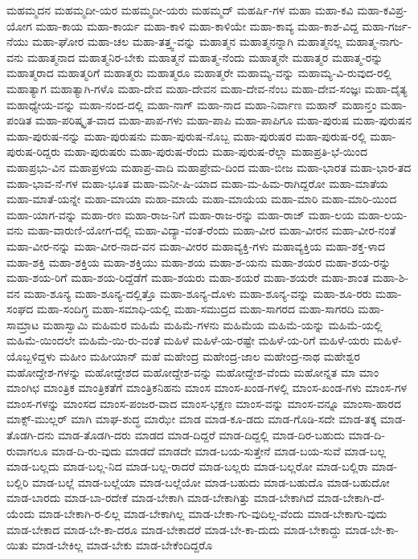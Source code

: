 {ಮಹಮ್ಮದನ
ಮಹಮ್ಮದೀ-ಯರ
ಮಹಮ್ಮದೀ-ಯರು
ಮಹಮ್ಮದ್
ಮಹರ್ಷಿ-ಗಳ
ಮಹಾ
ಮಹಾ-ಕವಿ
ಮಹಾ-ಕವಿಪ್ರ-ಯೋಗ
ಮಹಾ-ಕಾಯ
ಮಹಾ-ಕಾರ್ಯ
ಮಹಾ-ಕಾಳಿ
ಮಹಾ-ಕಾಳಿಯೇ
ಮಹಾ-ಕಾವ್ಯ
ಮಹಾ-ಕಾಶ-ವಿದ್ದ
ಮಹಾ-ಗರ್ಜ-ನೆಯು
ಮಹಾ-ಘೋರ
ಮಹಾ-ಚಲ
ಮಹಾ-ತತ್ತ್ವ-ವನ್ನು
ಮಹಾತ್ಮನ
ಮಹಾತ್ಮನನ್ನಾಗಿ
ಮಹಾತ್ಮನಲ್ಲ
ಮಹಾತ್ಮ-ನಾಗು-ವನು
ಮಹಾತ್ಮನಾದ
ಮಹಾತ್ಮನಿರ-ಬೇಕು
ಮಹಾತ್ಮನೆ
ಮಹಾತ್ಮ-ನೆಂದು
ಮಹಾತ್ಮನೇ
ಮಹಾತ್ಮರ
ಮಹಾತ್ಮ-ರನ್ನು
ಮಹಾತ್ಮರಾದ
ಮಹಾತ್ಮರಿಗೆ
ಮಹಾತ್ಮರು
ಮಹಾತ್ಮರೂ
ಮಹಾತ್ಮರೇ
ಮಹಾಮ್ಯ-ವನ್ನು
ಮಹಾಮ್ಯ-ವಿ-ರುವುದ-ರಲ್ಲಿ
ಮಹಾತ್ಯಾಗ
ಮಹಾತ್ಯಾಗಿ-ಗಳೊ
ಮಹಾ-ದೇವ
ಮಹಾ-ದೇವನ
ಮಹಾ-ದೇವ-ನೆಂಬ
ಮಹಾ-ದೇವ-ಸಂಜ್ಞಃ
ಮಹಾ-ದೈತ್ಯ
ಮಹಾಧ್ಯೇಯ-ವನ್ನು
ಮಹಾ-ನಂದ-ದಲ್ಲಿ
ಮಹಾ-ನಾಗ್
ಮಹಾ-ನಾದ
ಮಹಾ-ನಿರ್ವಾಣ
ಮಹಾನ್
ಮಹಾನ್ತಂ
ಮಹಾ-ಪಂಡಿತ
ಮಹಾ-ಪರಿಷ್ಕೃತ-ವಾದ
ಮಹಾ-ಪಾಪ-ಗಳು
ಮಹಾ-ಪಾಪಿ
ಮಹಾ-ಪಾಪಿಗೂ
ಮಹಾ-ಪುರುಷ
ಮಹಾ-ಪುರುಷನ
ಮಹಾ-ಪುರುಷ-ನನ್ನು
ಮಹಾ-ಪುರುಷನು
ಮಹಾ-ಪುರುಷ-ನೊಬ್ಬ
ಮಹಾ-ಪುರುಷರ
ಮಹಾ-ಪುರುಷ-ರಲ್ಲಿ
ಮಹಾ-ಪುರುಷ-ರಿದ್ದರು
ಮಹಾ-ಪುರುಷರು
ಮಹಾ-ಪುರುಷ-ರೆಂದು
ಮಹಾ-ಪುರುಷ-ರೆಲ್ಲಾ
ಮಹಾಪ್ರತಿ-ಭೆ-ಯಿಂದ
ಮಹಾಪ್ರಭು-ವಿನ
ಮಹಾಪ್ರಳಯ
ಮಹಾಪ್ರ-ವಾದಿ
ಮಹಾಪ್ರೇಮ-ದಿಂದ
ಮಹಾ-ಬೀಜ
ಮಹಾ-ಭಾರತ
ಮಹಾ-ಭಾರ-ತದ
ಮಹಾ-ಭಾವ-ನೆ-ಗಳ
ಮಹಾ-ಭೂತ
ಮಹಾ-ಮನೀ-ಷಿ-ಯಾದ
ಮಹಾ-ಮ-ಹಿಮ-ರಾಗಿದ್ದರೋ
ಮಹಾ-ಮಾತೆಯ
ಮಹಾ-ಮಾತೆ-ಯನ್ನೇ
ಮಹಾ-ಮಾಯಾ
ಮಹಾ-ಮಾಯೆ
ಮಹಾ-ಮಾಯೆಯ
ಮಹಾ-ಮಾರಿ
ಮಹಾ-ಮಾರಿ-ಯಿಂದ
ಮಹಾ-ಯಾಗ-ವನ್ನು
ಮಹಾ-ರಣ
ಮಹಾ-ರಾಜ-ನಿಗೆ
ಮಹಾ-ರಾಜ-ರನ್ನು
ಮಹಾ-ರಾಜ್
ಮಹಾ-ಲಯ
ಮಹಾ-ಲಯ-ವನು
ಮಹಾ-ವಾರುಣಿ-ಯೋಗ-ದಲ್ಲಿ
ಮಹಾ-ವಿದ್ಯಾ-ವಂತ-ರೆಂದು
ಮಹಾ-ವೀರ
ಮಹಾ-ವೀರನ
ಮಹಾ-ವೀರ-ನಂತೆ
ಮಹಾ-ವೀರ-ನನ್ನು
ಮಹಾ-ವೀರ-ನಾದ-ವನ
ಮಹಾ-ವೀರರ
ಮಹಾವ್ಯಕ್ತಿ-ಗಳು
ಮಹಾವ್ಯಕ್ತಿಯ
ಮಹಾ-ಶಕ್ತ-ಳಾದ
ಮಹಾ-ಶಕ್ತಿ
ಮಹಾ-ಶಕ್ತಿಯ
ಮಹಾ-ಶಕ್ತಿಯು
ಮಹಾ-ಶಯ
ಮಹಾ-ಶ-ಯನು
ಮಹಾ-ಶಯರ
ಮಹಾ-ಶಯ-ರನ್ನು
ಮಹಾ-ಶಯ-ರಿಗೆ
ಮಹಾ-ಶಯ-ರಿದ್ದೆಡೆಗೆ
ಮಹಾ-ಶಯರು
ಮಹಾ-ಶಯರೆ
ಮಹಾ-ಶಯರೇ
ಮಹಾ-ಶಾಂತ
ಮಹಾ-ಶಿ-ವನ
ಮಹಾ-ಶೂನ್ಯ
ಮಹಾ-ಶೂನ್ಯ-ದಲ್ಲಿತ್ತೊ
ಮಹಾ-ಶೂನ್ಯ-ದೊಳು
ಮಹಾ-ಶೂನ್ಯ-ವನ್ನು
ಮಹಾ-ಶೂ-ರರು
ಮಹಾ-ಸಂಘದ
ಮಹಾ-ಸಂದಿಗ್ಧ
ಮಹಾ-ಸಮಾಧಿ-ಯಲ್ಲಿ
ಮಹಾ-ಸಮುದ್ರದ
ಮಹಾ-ಸಾಗರದ
ಮಹಾ-ಸಾಗರದಿ
ಮಹಾ-ಸಾಮ್ರಾಟ
ಮಹಾಸ್ವಾಮಿ
ಮಹಿಮರ
ಮಹಿಮೆ
ಮಹಿಮೆ-ಗಳನು
ಮಹಿಮೆಯ
ಮಹಿಮೆ-ಯನ್ನು
ಮಹಿಮೆ-ಯಲ್ಲಿ
ಮಹಿಮೆ-ಯಿಂದಲೇ
ಮಹಿಮೆ-ಯಿ-ರು-ವಂತೆ
ಮಹಿಳೆ
ಮಹಿಳೆ-ಯ-ರಷ್ಟೇ
ಮಹಿಳೆ-ಯ-ರಿಗೆ
ಮಹಿಳೆ-ಯರು
ಮಹಿಳೆ-ಯೊಬ್ಬಳಿದ್ದಳು
ಮಹೀಂ
ಮಹೀಯಾನ್
ಮಹೆ
ಮಹೇಂದ್ರ
ಮಹೇಂದ್ರ-ಜಾಲ
ಮಹೇಂದ್ರ-ನಾಥ
ಮಹೇಶ್ವರ
ಮಹೋದ್ದೇಶ-ಗಳನ್ನು
ಮಹೋದ್ದೇಶದ
ಮಹೋದ್ದೇಶ-ವನ್ನು
ಮಹೋದ್ದೇಶ-ವೆಂದು
ಮಹೋನ್ನತ
ಮಾ
ಮಾಂ
ಮಾಂಗಿಛ
ಮಾಂತ್ರಿಕ
ಮಾಂತ್ರಿಕತೆಗೆ
ಮಾಂತ್ರಿಕನಿಹನು
ಮಾಂಸ
ಮಾಂಸ-ಖಂಡ-ಗಳಲ್ಲಿ
ಮಾಂಸ-ಖಂಡ-ಗಳು
ಮಾಂಸ-ಗಳ
ಮಾಂಸ-ಗಳನ್ನು
ಮಾಂಸದ
ಮಾಂಸ-ಪಂಜರ-ವಾದ
ಮಾಂಸ-ಭಕ್ಷಣ
ಮಾಂಸ-ವನ್ನು
ಮಾಂಸ-ವನ್ನೂ
ಮಾಂಸಾ-ಹಾರದ
ಮಾಕ್ಸ್-ಮುಲ್ಲರ್
ಮಾಗಿ
ಮಾಘ-ಶುದ್ಧ
ಮಾಝೇ
ಮಾಡ
ಮಾಡ-ಕೂ-ಡದು
ಮಾಡ-ಗೊಡಿ-ಸದೇ
ಮಾಡ-ತಕ್ಕ
ಮಾಡ-ತೊಡಗಿ-ದನು
ಮಾಡ-ತೊಡಗಿ-ದರು
ಮಾಡದ
ಮಾಡ-ದಿದ್ದರೆ
ಮಾಡ-ದಿದ್ದಲ್ಲಿ
ಮಾಡ-ದಿರ-ಬಹುದು
ಮಾಡ-ದಿ-ರುವಾಗಲೂ
ಮಾಡ-ದಿ-ರು-ವುದು
ಮಾಡದೆ
ಮಾಡದೇ
ಮಾಡ-ಬಯ-ಸುತ್ತೇನೆ
ಮಾಡ-ಬಯ-ಸುವೆ
ಮಾಡ-ಬಲ್ಲ
ಮಾಡ-ಬಲ್ಲದು
ಮಾಡ-ಬಲ್ಲ-ನಿದ
ಮಾಡ-ಬಲ್ಲ-ರಾದರೆ
ಮಾಡ-ಬಲ್ಲರು
ಮಾಡ-ಬಲ್ಲರೋ
ಮಾಡ-ಬಲ್ಲಿರಾ
ಮಾಡ-ಬಲ್ಲಿರಿ
ಮಾಡ-ಬಲ್ಲೆ
ಮಾಡ-ಬಲ್ಲೆಯಾ
ಮಾಡ-ಬಲ್ಲೆಯೋ
ಮಾಡ-ಬಹುದು
ಮಾಡ-ಬಹುದೊ
ಮಾಡ-ಬಹುದೋ
ಮಾಡ-ಬಾರದು
ಮಾಡ-ಬಾ-ರದೇಕೆ
ಮಾಡ-ಬೇಕಾಗಿ
ಮಾಡ-ಬೇಕಾಗಿತ್ತು
ಮಾಡ-ಬೇಕಾಗಿದೆ
ಮಾಡ-ಬೇಕಾಗಿ-ದೆ-ಯೆಂದು
ಮಾಡ-ಬೇಕಾಗಿ-ರ-ಲಿಲ್ಲ
ಮಾಡ-ಬೇಕಾಗಿಲ್ಲ
ಮಾಡ-ಬೇಕಾ-ಗು-ವುದಿಲ್ಲ-ವೆಂದು
ಮಾಡ-ಬೇಕಾಗು-ವುದು
ಮಾಡ-ಬೇಕಾದ
ಮಾಡ-ಬೇ-ಕಾ-ದರೂ
ಮಾಡ-ಬೇಕಾದರೆ
ಮಾಡ-ಬೇ-ಕಾ-ದುದು
ಮಾಡ-ಬೇಕಾದ್ದು
ಮಾಡ-ಬೇ-ಕಾ-ಯಿತು
ಮಾಡ-ಬೇಕಿಲ್ಲ
ಮಾಡ-ಬೇಕು
ಮಾಡ-ಬೇಕೆಂದಿದ್ದರೊ
}
